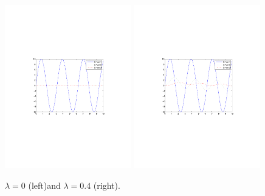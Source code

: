\begin{figure}[htbp]
\begin{center}
\includegraphics[width=0.49\textwidth]{../figs_06_traffic_flow/traffic_flow_3cars_ODE_l0}
\includegraphics[width=0.49\textwidth]{../figs_06_traffic_flow/traffic_flow_3cars_ODE_l04}
\end{center}
\caption{$\lambda=0$ (left)and $\lambda=0.4$ (right).}
\end{figure}

